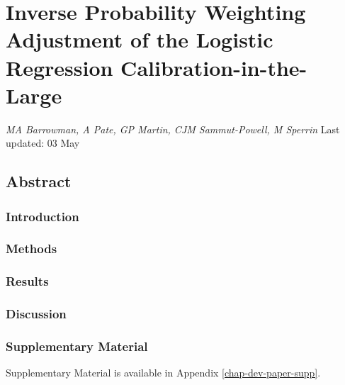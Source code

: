 \documentclass[12pt,PhD,twoside,openright]{muthesis}
\begin{document}
\hypertarget{chap-IPCW-logistic}{%
\chapter{Inverse Probability Weighting Adjustment of the Logistic Regression Calibration-in-the-Large}\label{chap-IPCW-logistic}}

\emph{MA Barrowman, A Pate, GP Martin, CJM Sammut-Powell, M Sperrin}
Last updated: 03 May

\hypertarget{abstract-1}{%
\section*{Abstract}\label{abstract-1}}

\hypertarget{introduction-3}{%
\subsection*{Introduction}\label{introduction-3}}

\hypertarget{methods-3}{%
\subsection*{Methods}\label{methods-3}}

\hypertarget{results-2}{%
\subsection*{Results}\label{results-2}}

\hypertarget{discussion-1}{%
\subsection*{Discussion}\label{discussion-1}}

\hypertarget{supplementary-material-1}{%
\subsection*{Supplementary Material}\label{supplementary-material-1}}

Supplementary Material is available in Appendix \ref{chap-dev-paper-supp}.
\end{document}
